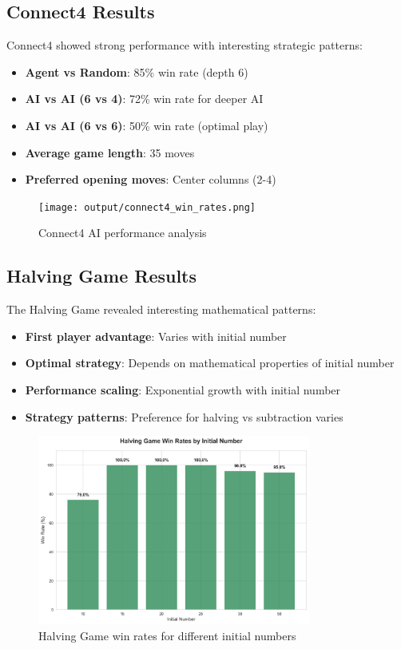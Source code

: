 \documentclass[12pt]{article}
\begin{document}
\subsection{Connect4 Results}

Connect4 showed strong performance with interesting strategic patterns:
\begin{itemize}
    \item \textbf{Agent vs Random}: 85\% win rate (depth 6)
    \item \textbf{AI vs AI (6 vs 4)}: 72\% win rate for deeper AI
    \item \textbf{AI vs AI (6 vs 6)}: 50\% win rate (optimal play)
    \item \textbf{Average game length}: 35 moves
    \item \textbf{Preferred opening moves}: Center columns (2-4)
\end{itemize}

\begin{figure}[H]
\centering
\texttt{[image: output/connect4\_win\_rates.png]}
\caption{Connect4 AI performance analysis}
\label{fig:connect4_win_rates}
\end{figure}

\subsection{Halving Game Results}

The Halving Game revealed interesting mathematical patterns:
\begin{itemize}
    \item \textbf{First player advantage}: Varies with initial number
    \item \textbf{Optimal strategy}: Depends on mathematical properties of initial number
    \item \textbf{Performance scaling}: Exponential growth with initial number
    \item \textbf{Strategy patterns}: Preference for halving vs subtraction varies
\end{itemize}

\begin{figure}[H]
\centering
\includegraphics[width=0.8\textwidth]{output/images/halving_win_rates.png}
\caption{Halving Game win rates for different initial numbers}
\label{fig:halving_win_rates}
\end{figure}
\end{document}
